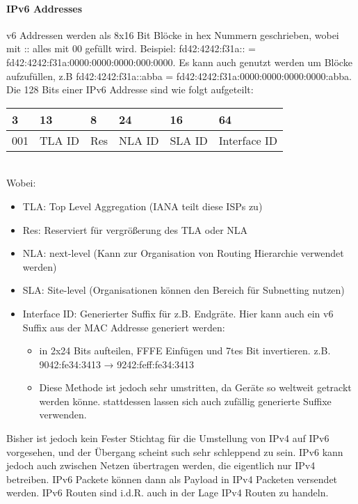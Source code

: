 		\paragraph{IPv6 Addresses}
			v6 Addressen werden als 8x16 Bit Blöcke in hex Nummern geschrieben, wobei mit :: alles mit 00 gefüllt wird. Beispiel: fd42:4242:f31a:: = fd42:4242:f31a:0000:0000:0000:000:0000. Es kann auch genutzt werden um Blöcke aufzufüllen, z.B fd42:4242:f31a::abba = fd42:4242:f31a:0000:0000:0000:0000:abba. Die 128 Bits einer IPv6 Addresse sind wie folgt aufgeteilt:
			\begin{table}[h]
				\centering
				\begin{tabular}{llllll}
				3 &
				  13 &
				  8 &
				  24 &
				  16 &
				  64 \\ \hline
				\multicolumn{1}{|l|}{001} &
				  \multicolumn{1}{l|}{TLA ID} &
				  \multicolumn{1}{l|}{Res} &
				  \multicolumn{1}{l|}{NLA ID} &
				  \multicolumn{1}{l|}{SLA ID} &
				  \multicolumn{1}{l|}{Interface ID} \\ \hline
				\end{tabular}
			\end{table} \\ 
			Wobei:
			\begin{itemize}
				\item TLA: Top Level Aggregation (IANA teilt diese ISPs zu)
				\item Res: Reserviert für vergrößerung des TLA oder NLA
				\item NLA: next-level (Kann zur Organisation von Routing Hierarchie verwendet werden)
				\item SLA: Site-level (Organisationen können den Bereich für Subnetting nutzen)
				\item Interface ID: Generierter Suffix für z.B. Endgräte. Hier kann auch ein v6 Suffix aus der MAC Addresse generiert werden: 
				\begin{itemize}
					\item in 2x24 Bits aufteilen, FFFE Einfügen und 7tes Bit invertieren. z.B. 9042:fe34:3413 → 9242:feff:fe34:3413
					\item Diese Methode ist jedoch sehr umstritten, da Geräte so weltweit getrackt werden könne. stattdessen lassen sich auch zufällig generierte Suffixe verwenden.
				\end{itemize} 
			\end{itemize}

			Bisher ist jedoch kein Fester Stichtag für die Umstellung von IPv4 auf IPv6 vorgesehen, und der Übergang scheint such sehr schleppend zu sein. IPv6 kann jedoch auch zwischen Netzen übertragen werden, die eigentlich nur IPv4 betreiben. IPv6 Packete können dann als Payload in IPv4 Packeten versendet werden. IPv6 Routen sind i.d.R. auch in der Lage IPv4 Routen zu handeln. 

